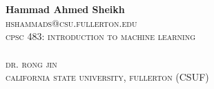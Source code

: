 \documentclass{article}
\begin{document}
\\~\\

\textbf{Hammad Ahmed Sheikh}\\
\textsc{hshammads@csu.fullerton.edu}\\
\textsc{cpsc 483: introduction to machine learning}\\~\\

\textsc{dr. rong jin}\\
\textsc{california state university, fullerton (CSUF)}\\
\end{document}
